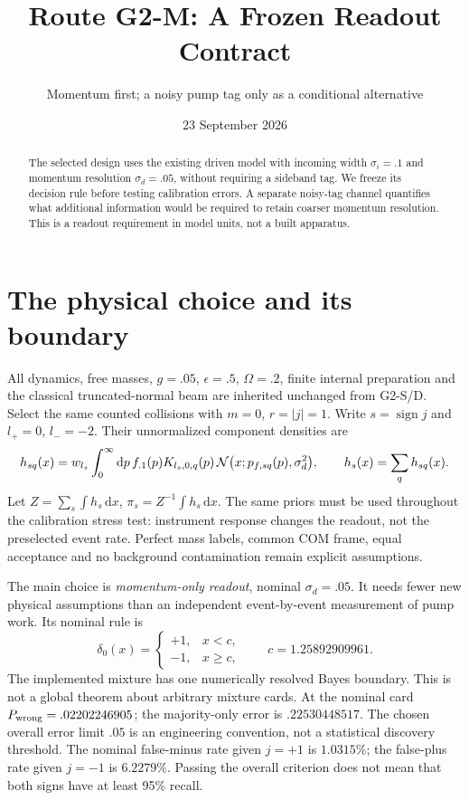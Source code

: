 \documentclass[11pt,a4paper]{article}
\title{Route G2-M: A Frozen Readout Contract}
\author{Momentum first; a noisy pump tag only as a conditional alternative}
\date{23 September 2026}
\newcommand{\dd}{\mathrm d}
\begin{document}
\maketitle
\begin{abstract}
The selected design uses the existing driven model with incoming width
$\sigma_i=.1$ and momentum resolution $\sigma_d=.05$, without requiring
a sideband tag. We freeze its decision rule before testing calibration
errors. A separate noisy-tag channel quantifies what additional
information would be required to retain coarser momentum resolution.
This is a readout requirement in model units, not a built apparatus.
\end{abstract}

\section{The physical choice and its boundary}
All dynamics, free masses, $g=.05$, $\epsilon=.5$, $\Omega=.2$,
finite internal preparation and the classical truncated-normal beam
are inherited unchanged from G2-S/D. Select the same counted collisions
with $m=0$, $r=|j|=1$. Write $s=\operatorname{sign}j$ and
$l_+=0$, $l_-=-2$. Their unnormalized component densities are
\begin{equation}
 h_{sq}(x)=w_{l_s}\int_0^\infty\dd p\,f_{.1}(p)
 K_{l_s,0,q}(p)\,
 {\cal N}\bigl(x;p_{f,sq}(p),\sigma_d^2\bigr),\qquad
 h_s(x)=\sum_qh_{sq}(x).
\end{equation}
Let $Z=\sum_s\int h_s\,\dd x$, $\pi_s=Z^{-1}\int h_s\,\dd x$.
The same priors must be used throughout the calibration stress test:
instrument response changes the readout, not the preselected event rate.
Perfect mass labels, common COM frame, equal acceptance and no
background contamination remain explicit assumptions.

The main choice is \emph{momentum-only readout}, nominal
$\sigma_d=.05$. It needs fewer new physical assumptions than an
independent event-by-event measurement of pump work. Its nominal rule is
\begin{equation}\label{eq:frozen}
 \delta_0(x)=
 \begin{cases}+1,&x<c,\\-1,&x\geq c,\end{cases}
 \qquad c=1.25892909961 .
\end{equation}
The implemented mixture has one numerically resolved Bayes boundary.
This is not a global theorem about arbitrary mixture cards.
At the nominal card $P_{\rm wrong}=.02202246905$; the majority-only
error is $.22530448517$. The chosen overall error limit $.05$ is an
engineering convention, not a statistical discovery threshold.
The nominal false-minus rate given $j=+1$ is $1.0315\%$; the
false-plus rate given $j=-1$ is $6.2279\%$. Passing the overall
criterion does not mean that both signs have at least 95\% recall.
\end{document}
